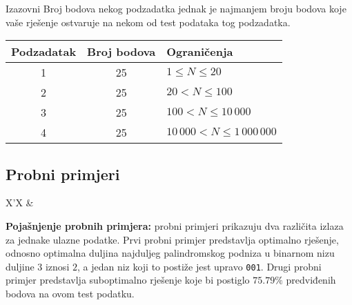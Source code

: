 \begin{statement}[
  problempoints=100,
  timelimit=5 sekundi,
  memorylimit=512 MiB,
]{Izazovni}
Broj bodova nekog podzadatka jednak je najmanjem broju bodova koje vaše rješenje
ostvaruje na nekom od test podataka tog podzadatka.

{\renewcommand{\arraystretch}{1.4}
  \setlength{\tabcolsep}{6pt}
  \begin{tabular}{ccl}
 Podzadatak & Broj bodova & Ograničenja \\ \midrule
  1 & 25 & $1 \le N \le 20$ \\
  2 & 25 & $20 < N \le 100$ \\
  3 & 25 & $100 < N \le 10\,000$ \\
  4 & 25 & $10\,000 < N \le 1\,000\,000$ \\
\end{tabular}}

\subsection*{Probni primjeri}
\begin{tabularx}{\textwidth}{X'X}
 &
\end{tabularx}

\textbf{Pojašnjenje probnih primjera:} probni primjeri prikazuju dva
različita izlaza za jednake ulazne podatke. Prvi probni primjer predstavlja
optimalno rješenje, odnosno optimalna duljina najduljeg palindromskog podniza
u binarnom nizu duljine $3$ iznosi $2$, a jedan niz koji to postiže jest upravo
\texttt{001}. Drugi probni primjer predstavlja suboptimalno rješenje koje
bi postiglo $75.79\%$ predviđenih bodova na ovom test podatku.

\end{statement}

